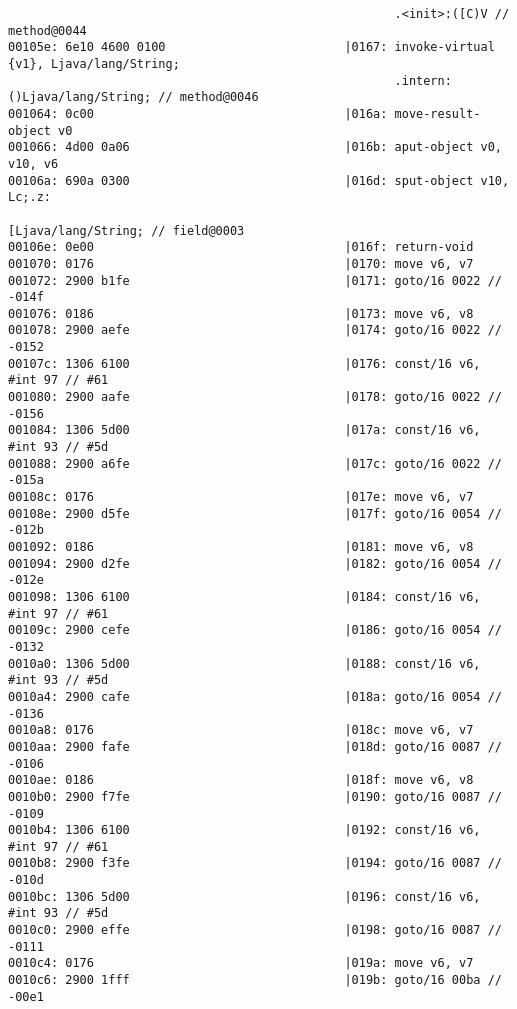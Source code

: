 \begin{lstlisting}
                                                      .<init>:([C)V // method@0044
00105e: 6e10 4600 0100                         |0167: invoke-virtual {v1}, Ljava/lang/String;
                                                      .intern:()Ljava/lang/String; // method@0046
001064: 0c00                                   |016a: move-result-object v0
001066: 4d00 0a06                              |016b: aput-object v0, v10, v6
00106a: 690a 0300                              |016d: sput-object v10, Lc;.z:
                                                      [Ljava/lang/String; // field@0003
00106e: 0e00                                   |016f: return-void
001070: 0176                                   |0170: move v6, v7
001072: 2900 b1fe                              |0171: goto/16 0022 // -014f
001076: 0186                                   |0173: move v6, v8
001078: 2900 aefe                              |0174: goto/16 0022 // -0152
00107c: 1306 6100                              |0176: const/16 v6, #int 97 // #61
001080: 2900 aafe                              |0178: goto/16 0022 // -0156
001084: 1306 5d00                              |017a: const/16 v6, #int 93 // #5d
001088: 2900 a6fe                              |017c: goto/16 0022 // -015a
00108c: 0176                                   |017e: move v6, v7
00108e: 2900 d5fe                              |017f: goto/16 0054 // -012b
001092: 0186                                   |0181: move v6, v8
001094: 2900 d2fe                              |0182: goto/16 0054 // -012e
001098: 1306 6100                              |0184: const/16 v6, #int 97 // #61
00109c: 2900 cefe                              |0186: goto/16 0054 // -0132
0010a0: 1306 5d00                              |0188: const/16 v6, #int 93 // #5d
0010a4: 2900 cafe                              |018a: goto/16 0054 // -0136
0010a8: 0176                                   |018c: move v6, v7
0010aa: 2900 fafe                              |018d: goto/16 0087 // -0106
0010ae: 0186                                   |018f: move v6, v8
0010b0: 2900 f7fe                              |0190: goto/16 0087 // -0109
0010b4: 1306 6100                              |0192: const/16 v6, #int 97 // #61
0010b8: 2900 f3fe                              |0194: goto/16 0087 // -010d
0010bc: 1306 5d00                              |0196: const/16 v6, #int 93 // #5d
0010c0: 2900 effe                              |0198: goto/16 0087 // -0111
0010c4: 0176                                   |019a: move v6, v7
0010c6: 2900 1fff                              |019b: goto/16 00ba // -00e1

\end{lstlisting}

